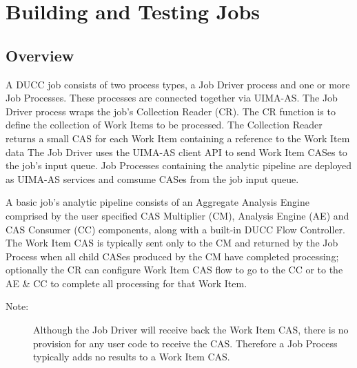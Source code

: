 % 
% 
% 
% 
\chapter{Building and Testing Jobs}

\section{Overview}

A DUCC job consists of two process types, a Job Driver process and one or more
Job Processes. These processes are connected together via UIMA-AS.
The Job Driver process wraps the job's Collection Reader (CR). The CR
function is to define the collection of Work Items to be processed.
The Collection Reader returns a small CAS for each Work Item containing a
reference to the Work Item data
The Job Driver uses the UIMA-AS client API to send Work Item CASes 
to the job's input queue. Job Processes containing the analytic pipeline are deployed
as UIMA-AS services and comsume CASes from the job input queue.

A basic job's analytic pipeline consists of an Aggregate Analysis Engine comprised by
the user specified CAS Multiplier (CM), Analysis Engine (AE) and CAS
Consumer (CC) components, along with a built-in DUCC Flow Controller.
The Work Item CAS is typically sent only to the CM and returned by
the Job Process when all child CASes produced by the CM have completed
processing; optionally the CR can configure Work Item CAS flow to go to the CC 
or to the AE \& CC to complete all processing for that Work Item.

	\begin{description}
	    \item[Note:] Although the Job Driver will receive back the Work Item CAS, 
	    there is no provision for any user code to receive the CAS. Therefore a
		Job Process typically adds no results to a Work Item CAS.
	\end{description}

